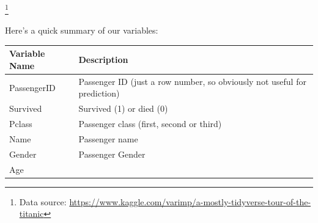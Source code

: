 \documentclass[]{book}
\let\rmarkdownfootnote\footnote%
\def\footnote{\protect\rmarkdownfootnote}
\begin{document}
\footnote{Data source: \url{https://www.kaggle.com/varimp/a-mostly-tidyverse-tour-of-the-titanic}}

Here's a quick summary of our variables:

\begin{longtable}[]{@{}ll@{}}
\toprule
\begin{minipage}[b]{0.49\columnwidth}\raggedright
Variable Name\strut
\end{minipage} & \begin{minipage}[b]{0.45\columnwidth}\raggedright
Description\strut
\end{minipage}\tabularnewline
\midrule
\endhead
\begin{minipage}[t]{0.49\columnwidth}\raggedright
PassengerID\strut
\end{minipage} & \begin{minipage}[t]{0.45\columnwidth}\raggedright
Passenger ID (just a row number, so obviously not useful for prediction)\strut
\end{minipage}\tabularnewline
\begin{minipage}[t]{0.49\columnwidth}\raggedright
Survived\strut
\end{minipage} & \begin{minipage}[t]{0.45\columnwidth}\raggedright
Survived (1) or died (0)\strut
\end{minipage}\tabularnewline
\begin{minipage}[t]{0.49\columnwidth}\raggedright
Pclass\strut
\end{minipage} & \begin{minipage}[t]{0.45\columnwidth}\raggedright
Passenger class (first, second or third)\strut
\end{minipage}\tabularnewline
\begin{minipage}[t]{0.49\columnwidth}\raggedright
Name\strut
\end{minipage} & \begin{minipage}[t]{0.45\columnwidth}\raggedright
Passenger name\strut
\end{minipage}\tabularnewline
\begin{minipage}[t]{0.49\columnwidth}\raggedright
Gender\strut
\end{minipage} & \begin{minipage}[t]{0.45\columnwidth}\raggedright
Passenger Gender\strut
\end{minipage}\tabularnewline
\begin{minipage}[t]{0.49\columnwidth}\raggedright
Age\strut
\end{minipage} & \begin{minipage}[t]{0.45\columnwidth}\raggedright

\end{minipage}
\end{longtable}
\end{document}
